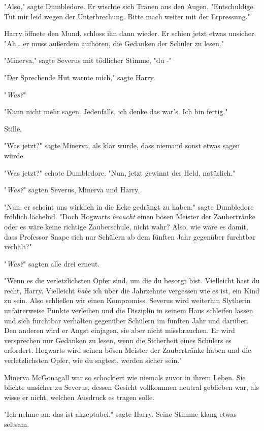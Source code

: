 {"Also," sagte Dumbledore. Er wischte sich Tränen aus den Augen. "Entschuldige. Tut mir leid wegen der Unterbrechung. Bitte mach weiter mit der Erpressung."

Harry öffnete den Mund, schloss ihn dann wieder. Er schien jetzt etwas unsicher. "Ah… er muss außerdem aufhören, die Gedanken der Schüler zu lesen."

"Minerva," sagte Severus mit tödlicher Stimme, "du -"

"Der Sprechende Hut warnte mich," sagte Harry.

"\emph{Was?}"

"Kann nicht mehr sagen. Jedenfalls, ich denke das war's. Ich bin fertig."

Stille.

"Was jetzt?" sagte Minerva, als klar wurde, dass niemand sonst etwas sagen würde.

"Was jetzt?" echote Dumbledore. "Nun, jetzt gewinnt der Held, natürlich."

"\emph{Was?}" sagten Severus, Minerva und Harry.

"Nun, er scheint uns wirklich in die Ecke gedrängt zu haben," sagte Dumbledore fröhlich lächelnd. "Doch Hogwarts \emph{braucht} einen bösen Meister der Zaubertränke oder es wäre keine richtige Zauberschule, nicht wahr? Also, wie wäre es damit, dass Professor Snape sich nur Schülern ab dem fünften Jahr gegenüber furchtbar verhält?"

"\emph{Was?}" sagten alle drei erneut.

"Wenn es die verletzlichsten Opfer sind, um die du besorgt bist. Vielleicht hast du recht, Harry. Vielleicht \emph{habe} ich über die Jahrzehnte vergessen wie es ist, ein Kind zu sein. Also schließen wir einen Kompromiss. Severus wird weiterhin Slytherin unfairerweise Punkte verleihen und die Disziplin in seinem Haus schleifen lassen und sich furchtbar verhalten gegenüber Schülern im fünften Jahr und darüber. Den anderen wird er Angst einjagen, sie aber nicht missbrauchen. Er wird versprechen nur Gedanken zu lesen, wenn die Sicherheit eines Schülers es erfordert. Hogwarts wird seinen bösen Meister der Zaubertränke haben und die verletzlichsten Opfer, wie du sagtest, werden sicher sein."

Minerva McGonagall war so schockiert wie niemals zuvor in ihrem Leben. Sie blickte unsicher zu Severus, dessen Gesicht vollkommen neutral geblieben war, als wisse er nicht, welchen Ausdruck es tragen solle.

"Ich nehme an, das ist akzeptabel," sagte Harry. Seine Stimme klang etwas seltsam.

}
